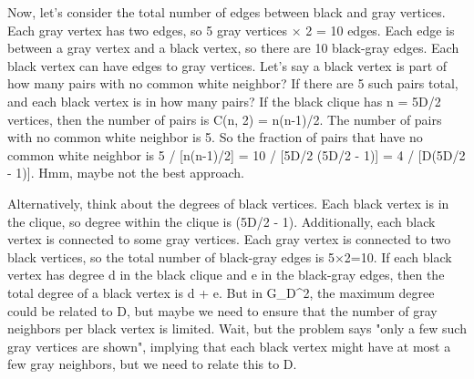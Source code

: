 Now, let's consider the total number of edges between black and gray vertices. Each gray vertex has two edges, so 5 gray vertices × 2 = 10 edges. Each edge is between a gray vertex and a black vertex, so there are 10 black-gray edges. Each black vertex can have edges to gray vertices. Let's say a black vertex is part of how many pairs with no common white neighbor? If there are 5 such pairs total, and each black vertex is in how many pairs? If the black clique has n = 5D/2 vertices, then the number of pairs is C(n, 2) = n(n-1)/2. The number of pairs with no common white neighbor is 5. So the fraction of pairs that have no common white neighbor is 5 / [n(n-1)/2] = 10 / [5D/2 (5D/2 - 1)] = 4 / [D(5D/2 - 1)]. Hmm, maybe not the best approach.

Alternatively, think about the degrees of black vertices. Each black vertex is in the clique, so degree within the clique is (5D/2 - 1). Additionally, each black vertex is connected to some gray vertices. Each gray vertex is connected to two black vertices, so the total number of black-gray edges is 5×2=10. If each black vertex has degree d in the black clique and e in the black-gray edges, then the total degree of a black vertex is d + e. But in G_D^2, the maximum degree could be related to D, but maybe we need to ensure that the number of gray neighbors per black vertex is limited. Wait, but the problem says "only a few such gray vertices are shown", implying that each black vertex might have at most a few gray neighbors, but we need to relate this to D.

